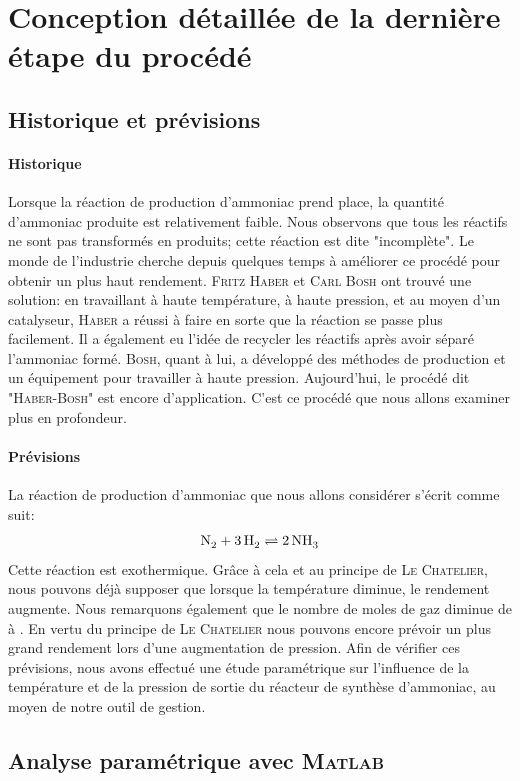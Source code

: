 \section{Conception détaillée de la dernière étape du procédé}
\subsection{Historique et prévisions}
\paragraph{Historique} 
Lorsque la réaction de production d'ammoniac prend place, la quantité d'ammoniac produite est relativement faible.
Nous observons que tous les réactifs ne sont pas transformés en produits; cette réaction est dite "incomplète".
Le monde de l'industrie cherche depuis quelques temps à améliorer ce procédé pour obtenir un plus haut rendement.
\textsc{Fritz Haber} et \textsc{Carl Bosh} ont trouvé une solution: en travaillant à haute température, à haute pression, et au moyen
d'un catalyseur, \textsc{Haber} a réussi à faire en sorte que la réaction se passe plus facilement.\cite{HABER} Il a également eu l'idée
de recycler les réactifs après avoir séparé l'ammoniac formé. \textsc{Bosh}, quant à lui, a développé des méthodes de
production et un équipement pour travailler à haute pression.\cite{tce} Aujourd'hui, le procédé dit "\textsc{Haber-Bosh}" est encore
d'application. C'est ce procédé que nous allons examiner plus en profondeur.
\paragraph{Prévisions}
La réaction de production d'ammoniac que nous allons considérer s'écrit comme suit:
$$\ce{N2} + \ce{3H2} \rightleftharpoons \ce{2NH3}$$
Cette réaction est exothermique. Grâce à cela et au principe de \textsc{Le Chatelier}, nous pouvons déjà supposer que lorsque
la température diminue, le rendement augmente. Nous remarquons également que le nombre de moles de gaz diminue de  à
. En vertu du principe de \textsc{Le Chatelier} nous pouvons encore prévoir un plus grand rendement lors d'une augmentation de
pression. Afin de vérifier ces prévisions, nous avons effectué une étude paramétrique sur l'influence de la température et de la
pression de sortie du réacteur de synthèse d'ammoniac, au moyen de notre outil de gestion.
\subsection{Analyse paramétrique avec \textsc{Matlab}}
